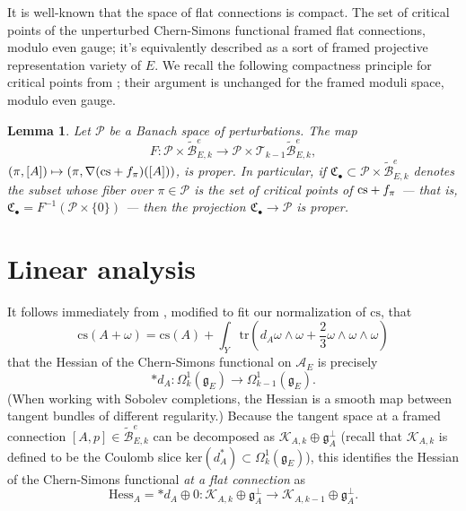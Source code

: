 \documentclass{memo-l}
\newtheorem{lemma}[theorem]{Lemma}
\theoremstyle{definition}
\theoremstyle{remark}
\numberwithin{section}{chapter}
\numberwithin{equation}{chapter}
\begin{document}
It is well-known that the space of flat connections is compact. The set of critical points of the unperturbed Chern-Simons functional framed flat connections, modulo even gauge; it's equivalently described as a sort of framed projective representation variety of $E$. We recall the following compactness principle for critical points from \cite[Lemma~3.8]{KM1}; their argument is unchanged for the framed moduli space, modulo even gauge.

\begin{lemma}\label{prop1}Let $\mathcal P$ be a Banach space of perturbations. The map $$F: \mathcal P \times \widetilde{\mathcal B}^e_{E,k} \to \mathcal P \times \mathcal T_{k-1} \widetilde{\mathcal B}^e_{E,k},$$  $(\pi, [A]) \mapsto (\pi, \nabla(\textup{cs}+f_\pi)([A]))$, is proper. In particular, if $\mathfrak C_\bullet \subset \mathcal P \times \widetilde{\mathcal B}^e_{E,k}$ denotes the subset whose fiber over $\pi \in \mathcal P$ is the set of critical points of $\textup{cs} + f_\pi$ --- that is, $\mathfrak C_\bullet = F^{-1}(\mathcal P \times \{0\})$ --- then the projection $\mathfrak C_\bullet \to \mathcal P$ is proper.
\end{lemma}

\section{Linear analysis}\label{sec:3d-linear}
It follows immediately from \cite[Equation~2.18]{Don}, modified to fit our normalization of $\text{cs}$, that $$\text{cs}(A+\omega) = \text{cs}(A) + \int_Y \text{tr}(d_A \omega \wedge \omega + \frac 23 \omega \wedge \omega \wedge \omega)$$ that the Hessian of the Chern-Simons functional on $\mathcal A_E$ is precisely 
$$*d_A: \Omega^1_k(\mathfrak g_E) \to \Omega^1_{k-1}(\mathfrak g_E).$$ 
(When working with Sobolev completions, the Hessian is a smooth map between tangent bundles of different regularity.) Because the tangent space at a framed connection $[A,p] \in \widetilde{\mathcal B}^e_{E,k}$ can be decomposed as $\mathcal K_{A,k} \oplus \mathfrak g_A^\perp$ (recall that $\mathcal K_{A,k}$ is defined to be the Coulomb slice $\text{ker}(d_A^*) \subset \Omega^1_k(\mathfrak g_E)$), this identifies the Hessian of the Chern-Simons functional \emph{at a flat connection} as 
$$\text{Hess}_A = *d_A \oplus 0: \mathcal K_{A,k} \oplus \mathfrak g_A^\perp \to \mathcal K_{A,k-1} \oplus \mathfrak g_A^\perp.$$ 
\end{document}
